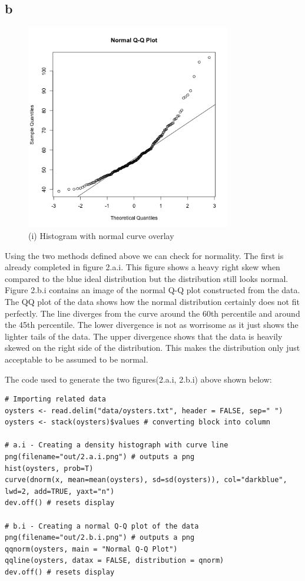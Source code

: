 \documentclass[a4paper, 12pt]{article}
\begin{document}
    \subsection{b}
        \renewcommand{\figurename}{Figure 2.b}
        \begin{figure}[h]
            \centering
            \includegraphics[width=0.8\textwidth]{2.b.i.png}
            \caption{(i) Histogram with normal curve overlay}
            \label{fig:mesh1}
        \end{figure}
        Using the two methods defined above we can check for normality. The first is already completed in figure 2.a.i. This figure shows a heavy right skew when compared to the blue ideal distribution but the distribution still looks normal. Figure 2.b.i contains an image of the normal Q-Q plot constructed from the data.  The QQ plot of the data shows how the normal distribution certainly does not fit perfectly. The line diverges from the curve around the 60th percentile and around the 45th percentile. The lower divergence is not as worrisome as it just shows the lighter tails of the data. The upper divergence shows that the data is heavily skewed on the right side of the distribution. This makes the distribution only just acceptable to be assumed to be normal.

        The code used to generate the two figures(2.a.i, 2.b.i) above shown below:
        \begin{lstlisting}
# Importing related data
oysters <- read.delim("data/oysters.txt", header = FALSE, sep=" ")
oysters <- stack(oysters)$values # converting block into column

# a.i - Creating a density histograph with curve line
png(filename="out/2.a.i.png") # outputs a png
hist(oysters, prob=T)
curve(dnorm(x, mean=mean(oysters), sd=sd(oysters)), col="darkblue", lwd=2, add=TRUE, yaxt="n")
dev.off() # resets display

# b.i - Creating a normal Q-Q plot of the data
png(filename="out/2.b.i.png") # outputs a png
qqnorm(oysters, main = "Normal Q-Q Plot")
qqline(oysters, datax = FALSE, distribution = qnorm)
dev.off() # resets display
        \end{lstlisting}
\end{document}
